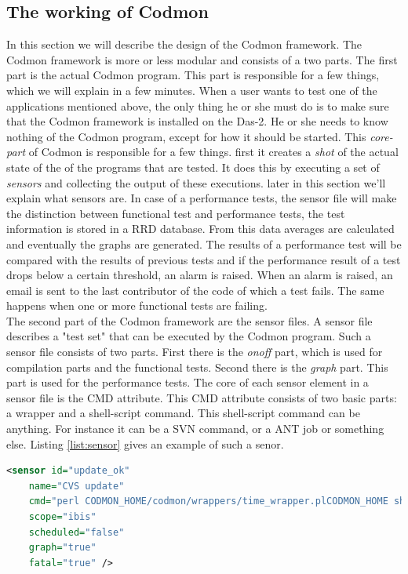 \documentclass{article}
\begin{document}
\subsection{The working of Codmon}
\label{subsec:CodmonDesign}
In this section we will describe the design of the Codmon framework. The Codmon framework is more or less modular and consists of a two parts. The first part is the actual Codmon program. This part 
is responsible for a few things, which we will explain in a few minutes. When a user wants to test one of the applications mentioned above, the only thing he or she must do is to make sure that the Codmon 
framework is installed on the Das-2. He or she needs to know nothing of the Codmon program, except for how it should be started. This \emph{core-part} of Codmon is responsible for a few things. first
it creates a \emph{shot} of the actual state of the of the programs that are tested. It does this by executing a set of \emph{sensors} and collecting the output of these executions. later in this 
section we'll explain what sensors are. In case of a performance tests, the sensor file will make the distinction between functional test and performance tests, the test information is stored in 
a RRD database\cite{RRD}. From this data averages are calculated and eventually the graphs are generated\cite{Codmon}. The results of a performance test will be compared with the results of previous tests 
and if the performance result of a test drops below a certain threshold, an alarm is raised. When an alarm is raised, an email is sent to the last contributor of the code of which a test fails. 
The same happens when one or more functional tests are failing.\\

\noindent The second part of the Codmon framework are the sensor files. A sensor file describes a "test set" that can be executed by the Codmon program. Such a sensor file consists of two parts. 
First there is the \emph{onoff} part, which is used for compilation parts and the functional tests.  Second there is the \emph{graph} part. This part is used for the performance tests. 
The core of each sensor element in a sensor file is the CMD attribute. This CMD attribute consists of two basic parts: a wrapper and a shell-script command. This shell-script command can be anything. 
For instance it can be a SVN command, or a ANT job or something else. Listing \ref{list:sensor} gives an example of such a senor. \\

\begin{lstlisting}[frame=shadowbox, language=XML,showstringspaces=false]
 <sensor id="update_ok" 
    name="CVS update" 
    cmd="perl CODMON_HOME/codmon/wrappers/time_wrapper.plCODMON_HOME sh codmon/local/cvsup.sh" 
    scope="ibis" 
    scheduled="false" 
    graph="true" 
    fatal="true" />
\end{lstlisting}
 
\end{document}
